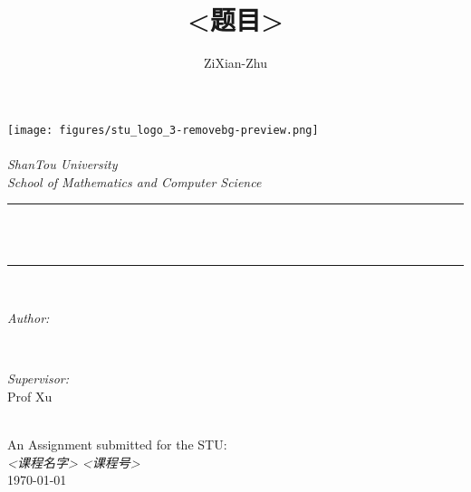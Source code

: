 
\title{<题目>}
\author{\textup{ZiXian-Zhu}}


\begin{titlepage}
    \newcommand{\HRule}{\rule{\linewidth}{0.5mm}}
    \pagecolor{gray!10} %
    \texttt{[image: figures/stu\_logo\_3-removebg-preview.png]}\\[1cm] 
    \center 
    \quad\\[1.5cm]
    \textsl{\Large ShanTou University}\\[0.5cm] 
    \textsl{\large School of Mathematics and Computer Science}\\[0.5cm] 
    \makeatletter
    \HRule \\[0.4cm]
    { \huge \bfseries \@title}\\[0.4cm] 
    \HRule \\[1.5cm]
    \begin{minipage}{0.4\textwidth}
        \begin{flushleft} \large
            \emph{Author:}\\
            \@author 
        \end{flushleft}
    \end{minipage}
    ~
    \begin{minipage}{0.4\textwidth}
        \begin{flushright} \large
            \emph{Supervisor:} \\
            \textup{Prof Xu}
        \end{flushright}
    \end{minipage}\\[3cm]
    \makeatother
    {\large An Assignment submitted for the STU:}\\[0.5cm]
    {\large \emph{<课程名字> <课程号>}}\\[0.5cm]
    {\large \today}\\[2cm] 
    \vfill 
\end{titlepage}


